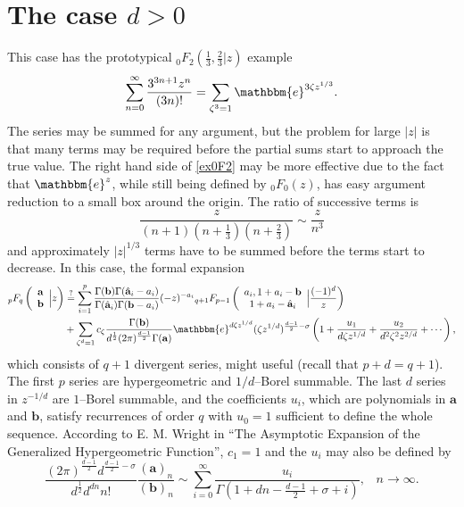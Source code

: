 \documentclass[12pt]{article}
\newcommand{\ee}[0] {\mathbbm{e}}
\numberwithin{equation}{section}
\newcommand{\FF}[6] {{}_{#1}{#2}_{#3} \left( \begin{array}{c} #4 \\ #5 \end{array} \Big| {#6}  \right)}
\newcommand{\FFf}[5] {{}_{#1}{#2}_{#3} \left(#4 | {#5} \right)}
\newcommand{\bfa}[0] {\mathbf{a}}
\newcommand{\bfb}[0] {\mathbf{b}}
\begin{document}
\section{The case $d>0$}
This case has the prototypical $\FFf{0}{F}{2}{\tfrac13, \tfrac23}{z}$ example
\begin{equation}
\label{ex0F2}
\sum_{n=0}^{\infty}\frac{3^{3n+1}z^n}{(3n)!} = \sum_{\zeta^3=1} \ee^{3\zeta z^{1/3}}\text{.}
\end{equation}
The series may be summed for any argument, but the problem for large $|z|$ is that many terms may be required before the partial sums start to approach the true value. The right hand side of \eqref{ex0F2} may be more effective due to the fact that $\ee^{z}$, while still being defined by ${}_0 F_0(z)$, has easy argument reduction to a small box around the origin. The ratio of successive terms is
\begin{equation*}
\frac{z}{(n+1) (n+\frac{1}{3}) (n+\frac{2}{3})} \sim \frac{z}{n^3}
\end{equation*}
and approximately $|z|^{1/3}$ terms have to be summed before the terms start to decrease. In this case, the formal expansion
\begin{equation}
\label{entirerecp}
\begin{alignedat}{1}
\FF{p}{F}{q}{\mathbf{a}}{\mathbf{b}}{z}&\overset{?}{=}\sum_{i=1}^{p} \frac{\Gamma(\mathbf{b}) \Gamma(\hat{\mathbf{a}}_i-a_i)}{\Gamma(\hat{\mathbf{a}}_i)\Gamma(\mathbf{b}-a_i)} (-z)^{-a_i} \FF{q+1}{F}{p-1}{a_i,1+a_i-\mathbf{b}}{1+a_i-\hat{\mathbf{a}}_i}{\frac{(-1)^d}{z}}\\
&+\sum_{\zeta^d=1} c_{\zeta} \frac{\Gamma(\mathbf{b})}{d^{\frac{1}{2}} (2 \pi )^{\frac{d-1}{2}} \Gamma(\mathbf{a})} \ee^{d \zeta z^{1/d}}(\zeta z^{1/d})^{\frac{d-1}{2}-\sigma} \left(1+\frac{u_1}{d \zeta z^{1/d}}+\frac{u_2}{d^2 \zeta^2 z^{2/d}}+\cdots\right)\text{,}
\end{alignedat}
\end{equation}
which consists of $q+1$ divergent series, might useful (recall that $p+d=q+1$). The first $p$ series are hypergeometric and $1/d$--Borel summable. The last $d$ series in $z^{-1/d}$ are $1$--Borel summable, and the coefficients $u_i$, which are polynomials in $\mathbf{a}$ and $\mathbf{b}$, satisfy recurrences of order $q$ with $u_0=1$ sufficient to define the whole sequence. According to E. M. Wright in ``The Asymptotic Expansion of the Generalized Hypergeometric Function'', $c_{1}=1$ and the $u_i$ may also be defined by
\begin{equation*}
\frac{(2 \pi )^{\frac{d-1}{2}} d^{\frac{d-1}{2}-\sigma
   }}{d^{\frac12} d^{dn}n!}\frac{(\bfa)_n}{(\bfb)_n} \sim \sum_{i=0}^{\infty}\frac{u_i}{\Gamma \left(1+d
   n-\frac{d-1}{2}+\sigma+i\right)}\text{,} \quad n \to \infty\text{.}
\end{equation*}
\end{document}
